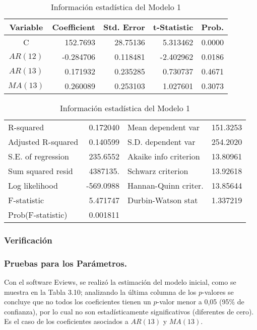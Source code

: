 \begin{table}[H]
\centering\small
\caption{Informaci\'{o}n estad\'{i}stica del Modelo 1}
\begin{tabular}{@{}crrrr@{}}
\toprule
Variable& Coefficient& Std. Error& t-Statistic& Prob. \\
\midrule
C& 152.7693& 28.75136& 5.313462& 0.0000 \\
$AR(12)$& -0.284706& 0.118481& -2.402962& 0.0186 \\
$AR(13)$& 0.171932& 0.235285& 0.730737& 0.4671 \\
$MA(13)$& 0.260089& 0.253103& 1.027601& 0.3073 \\
\bottomrule
\end{tabular}

\begin{tabular}{@{}lrlr@{}}
\toprule
R-squared& 0.172040& Mean dependent var & 151.3253 \\
Adjusted R-squared& 0.140599& S.D. dependent var & 254.2020 \\
S.E. of regression& 235.6552& Akaike info criterion& 13.80961 \\
Sum squared resid& 4387135.& Schwarz criterion & 13.92618 \\
Log likelihood& -569.0988& Hannan-Quinn criter. & 13.85644 \\
F-statistic& 5.471747& Durbin-Watson stat & 1.337219 \\
Prob(F-statistic)& 0.001811&\\
\bottomrule
\end{tabular}
\end{table}


\subsubsection*{Verificaci\'{o}n}

\subsubsection*{Pruebas para los Par\'{a}metros.}

Con el software Eviews, se realiz\'{o} la estimaci\'{o}n del modelo inicial, como se muestra en la Tabla 3.10; analizando la \'{u}ltima columna de los $p$-valores se concluye que no todos los coeficientes tienen un $p$-valor menor a 0,05 (95{\%} de confianza), por lo cual no son estad\'{i}sticamente significativos (diferentes de cero). Es el caso de los coeficientes asociados a $AR(13)$ y $MA(13)$.\newline

